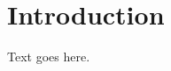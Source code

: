 \documentclass[12pt]{article}
\begin{document}
\sloppy





\newpage

\section{Introduction}
Text goes here.
\end{document}

